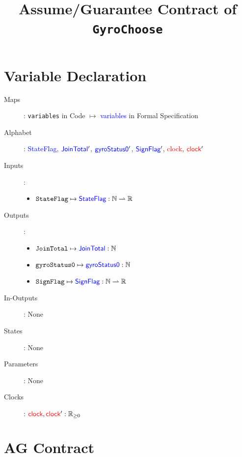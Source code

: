 \documentclass[fleqn,a4paper]{article}
\newcommand\var[1]{\texttt{#1}}
\newcommand\Var[1]{\textcolor{blue}{\textsf{#1}}}
\newcommand\clock{\textcolor{red}{\textsf{clock}}}
\begin{document}
\title{Assume/Guarantee Contract of \texttt{GyroChoose}}
\author{}

\maketitle

\section{Variable Declaration}

\begin{description}
\item[Maps]:
\var{variables} in Code $\mapsto$ \Var{variables} in Formal Specification

\item[Alphabet]:
\Var{StateFlag},
$\Var{JoinTotal}'$,
$\Var{gyroStatus0}'$,
$\Var{SignFlag}'$,
\clock,
$\clock'$

\item[Inputs]:
\begin{itemize}
\item $\var{StateFlag} \mapsto \Var{StateFlag} : \mathbb{N} \rightharpoonup \mathbb{R}$
\end{itemize}

\item[Outputs]:
\begin{itemize}
\item $\var{JoinTotal} \mapsto \Var{JoinTotal} : \mathbb{N}$
\item $\var{gyroStatus0} \mapsto \Var{gyroStatus0} : \mathbb{N}$
\item $\var{SignFlag} \mapsto \Var{SignFlag} : \mathbb{N} \rightharpoonup \mathbb{R}$
\end{itemize}

\item[In-Outputs]: None

\item[States]: None

\item[Parameters]: None

\item[Clocks]:
$\clock,\clock' : \mathbb{R}_{\geq 0}$

\end{description}

\section{AG Contract}
\end{document}
